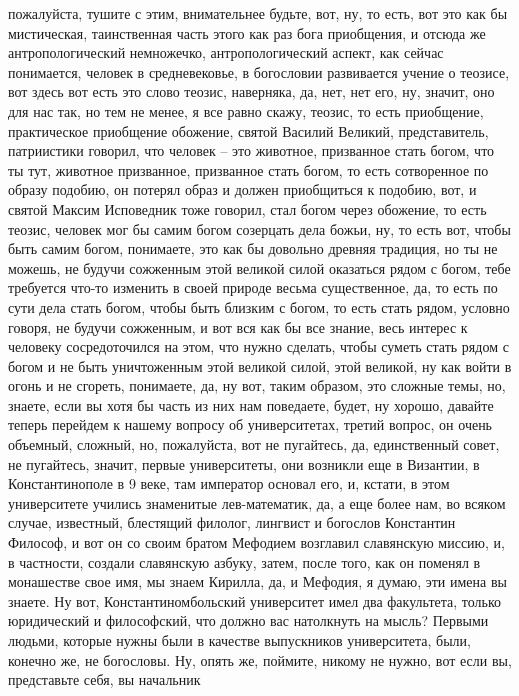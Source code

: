 пожалуйста, тушите с этим, внимательнее будьте, вот, ну, то есть, вот это как бы
мистическая, таинственная часть этого как раз бога приобщения, и отсюда же
антропологический немножечко, антропологический аспект, как сейчас понимается,
человек в средневековье, в богословии развивается учение о теозисе, вот здесь
вот есть это слово теозис, наверняка, да, нет, нет его, ну, значит, оно для нас
так, но тем не менее, я все равно скажу, теозис, то есть приобщение,
практическое приобщение обожение, святой Василий Великий, представитель,
патриистики говорил, что человек – это животное, призванное стать богом, что ты
тут, животное призванное, призванное стать богом, то есть сотворенное по образу
подобию, он потерял образ и должен приобщиться к подобию, вот, и святой Максим
Исповедник тоже говорил, стал богом через обожение, то есть теозис, человек мог
бы самим богом созерцать дела божьи, ну, то есть вот, чтобы быть самим богом,
понимаете, это как бы довольно древняя традиция, но ты не можешь, не будучи
сожженным этой великой силой оказаться рядом с богом, тебе требуется что-то
изменить в своей природе весьма существенное, да, то есть по сути дела стать
богом, чтобы быть близким с богом, то есть стать рядом, условно говоря, не
будучи сожженным, и вот вся как бы все знание, весь интерес к человеку
сосредоточился на этом, что нужно сделать, чтобы суметь стать рядом с богом и не
быть уничтоженным этой великой силой, этой великой, ну как войти в огонь и не
сгореть, понимаете, да, ну вот, таким образом, это сложные темы, но, знаете,
если вы хотя бы часть из них нам поведаете, будет, ну хорошо, давайте теперь
перейдем к нашему вопросу об университетах, третий вопрос, он очень объемный,
сложный, но, пожалуйста, вот не пугайтесь, да, единственный совет, не пугайтесь,
значит, первые университеты, они возникли еще в Византии, в Константинополе в 9
веке, там император основал его, и, кстати, в этом университете учились
знаменитые лев-математик, да, а еще более нам, во всяком случае, известный,
блестящий филолог, лингвист и богослов Константин Философ, и вот он со своим
братом Мефодием возглавил славянскую миссию, и, в частности, создали славянскую
азбуку, затем, после того, как он поменял в монашестве свое имя, мы знаем
Кирилла, да, и Мефодия, я думаю, эти имена вы знаете. Ну вот,
Константиномбольский университет имел два факультета, только юридический и
философский, что должно вас натолкнуть на мысль? Первыми людьми, которые нужны
были в качестве выпускников университета, были, конечно же, не богословы. Ну,
опять же, поймите, никому не нужно, вот если вы, представьте себя, вы начальник
